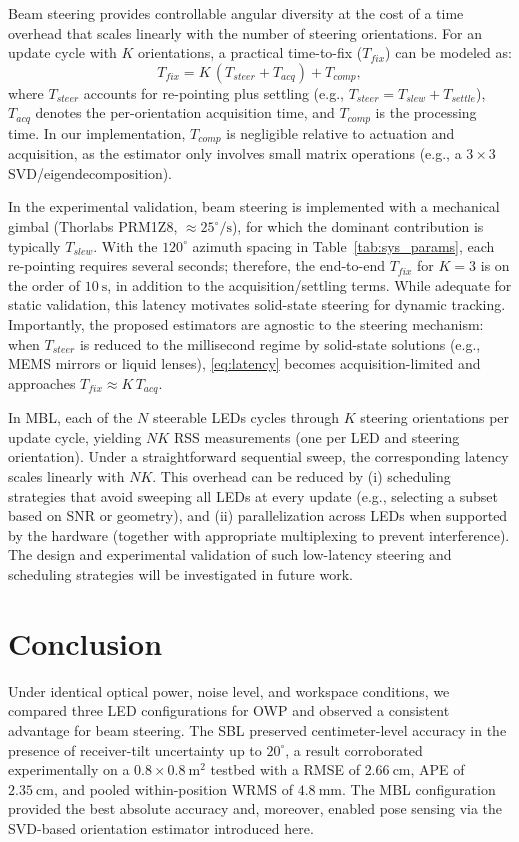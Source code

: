 \documentclass[conference]{IEEEtran}
\begin{document}
Beam steering provides controllable angular diversity at the cost of a time overhead that scales linearly with the number of steering orientations. For an update cycle with $K$ orientations, a practical time-to-fix ($T_{fix}$) can be modeled as:
\begin{equation}
T_{fix} = K\,(T_{steer} + T_{acq}) + T_{comp},
\label{eq:latency}
\end{equation}
where $T_{steer}$ accounts for re-pointing plus settling (e.g., $T_{steer}=T_{slew}+T_{settle}$), $T_{acq}$ denotes the per-orientation acquisition time, and $T_{comp}$ is the processing time. In our implementation, $T_{comp}$ is negligible relative to actuation and acquisition, as the estimator only involves small matrix operations (e.g., a $3{\times}3$ SVD/eigendecomposition). 

In the experimental validation, beam steering is implemented with a mechanical gimbal (Thorlabs PRM1Z8, $\approx 25^\circ/\mathrm{s}$), for which the dominant contribution is typically $T_{slew}$. With the $120^\circ$ azimuth spacing in Table~\ref{tab:sys_params}, each re-pointing requires several seconds; therefore, the end-to-end $T_{fix}$ for $K=3$ is on the order of $10~\mathrm{s}$, in addition to the acquisition/settling terms. While adequate for static validation, this latency motivates solid-state steering for dynamic tracking. Importantly, the proposed estimators are agnostic to the steering mechanism: when $T_{steer}$ is reduced to the millisecond regime by solid-state solutions (e.g., MEMS mirrors or liquid lenses), \eqref{eq:latency} becomes acquisition-limited and approaches $T_{fix}\approx K\,T_{acq}$.

In MBL, each of the $N$ steerable LEDs cycles through $K$ steering orientations per update cycle, yielding $NK$ RSS measurements (one per LED and steering orientation). Under a straightforward sequential sweep, the corresponding latency scales linearly with $NK$. This overhead can be reduced by (i) scheduling strategies that avoid sweeping all LEDs at every update (e.g., selecting a subset based on SNR or geometry), and (ii) parallelization across LEDs when supported by the hardware (together with appropriate multiplexing to prevent interference).  
The design and experimental validation of such low-latency steering and scheduling strategies will be investigated in future work.


\section{Conclusion}
Under identical optical power, noise level, and workspace conditions, we compared three LED configurations for OWP and observed a consistent advantage for beam steering. The SBL preserved centimeter-level accuracy in the presence of receiver-tilt uncertainty up to $20^\circ$, a result corroborated experimentally on a $0.8{\times}0.8~\mathrm{m}^2$ testbed with a RMSE of $2.66~\mathrm{cm}$, APE of $2.35~\mathrm{cm}$, and pooled within-position WRMS of $4.8~\mathrm{mm}$. The MBL configuration provided the best absolute accuracy and, moreover, enabled pose sensing via the SVD-based orientation estimator introduced here.
\end{document}
